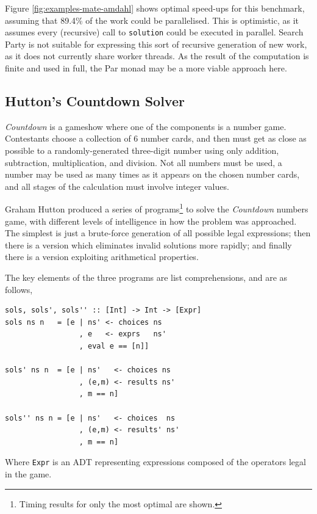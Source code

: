 Figure \ref{fig:examples-mate-amdahl} shows optimal speed-ups for this
benchmark, assuming that 89.4\% of the work could be
parallelised. This is optimistic, as it assumes every (recursive) call
to \verb|solution| could be executed in parallel. Search Party is not
suitable for expressing this sort of recursive generation of new work,
as it does not currently share worker threads. As the result of the
computation is finite and used in full, the Par monad may be a more
viable approach here.

\subsection*{Hutton's Countdown Solver}
\label{sec:prelims-searchparty-examples-hutton}

\textit{Countdown} is a gameshow where one of the components is a
number game. Contestants choose a collection of 6 number cards, and
then must get as close as possible to a randomly-generated three-digit
number using only addition, subtraction, multiplication, and
division. Not all numbers must be used, a number may be used as many
times as it appears on the chosen number cards, and all stages of the
calculation must involve integer values.

Graham Hutton produced a series of programs\footnote{Timing results
  for only the most optimal are shown.} to solve the
\textit{Countdown} numbers game\cite{hutton}, with different levels of
intelligence in how the problem was approached. The simplest is just a
brute-force generation of all possible legal expressions; then there
is a version which eliminates invalid solutions more rapidly; and
finally there is a version exploiting arithmetical properties.

The key elements of the three programs are list comprehensions, and
are as follows,

\begin{verbatim}
sols, sols', sols'' :: [Int] -> Int -> [Expr]
sols ns n   = [e | ns' <- choices ns
                 , e   <- exprs   ns'
                 , eval e == [n]]

sols' ns n  = [e | ns'   <- choices ns
                 , (e,m) <- results ns'
                 , m == n]

sols'' ns n = [e | ns'   <- choices  ns
                 , (e,m) <- results' ns'
                 , m == n]
\end{verbatim}

Where \verb|Expr| is an ADT representing expressions composed of the
operators legal in the game.

